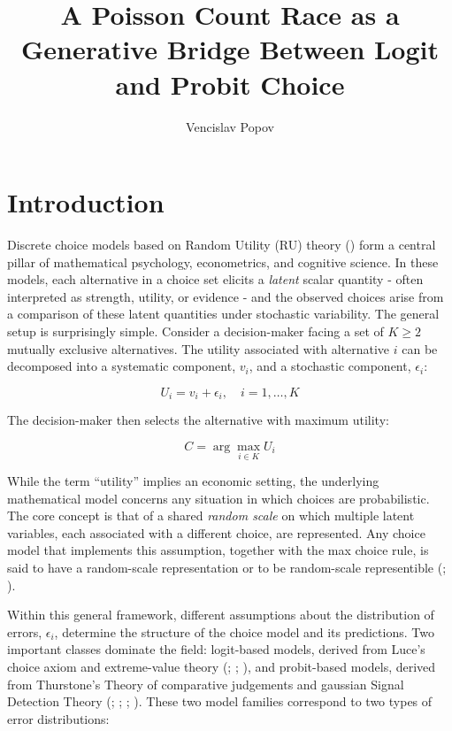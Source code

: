 \documentclass[
  man,
  floatsintext,
  longtable,
  a4paper,
  nolmodern,
  notxfonts,
  notimes,
  colorlinks=true,linkcolor=blue,citecolor=blue,urlcolor=blue]{apa7}
\title{A Poisson Count Race as a Generative Bridge Between Logit and
Probit Choice}
\author{Vencislav Popov}
\affiliation{
{Department of Psychology, University of Zurich}}
\begin{document}
\maketitle



\setcounter{secnumdepth}{3}

\setlength\LTleft{0pt}




\section{Introduction}\label{introduction}

Discrete choice models based on Random Utility (RU) theory
()
form a central pillar of mathematical psychology, econometrics, and
cognitive science. In these models, each alternative in a choice set
elicits a \emph{latent} scalar quantity - often interpreted as strength,
utility, or evidence - and the observed choices arise from a comparison
of these latent quantities under stochastic variability. The general
setup is surprisingly simple. Consider a decision-maker facing a set of
\(K \ge 2\) mutually exclusive alternatives. The utility associated with
alternative \(i\) can be decomposed into a systematic component,
\(v_i\), and a stochastic component, \(\epsilon_i\):

\[
U_{i} = v_{i} + \epsilon_{i}, \quad i=1, \dots, K
\]

The decision-maker then selects the alternative with maximum utility:

\[
C = \arg \max_{i \in K} U_{i}
\]

While the term ``utility'' implies an economic setting, the underlying
mathematical model concerns any situation in which choices are
probabilistic. The core concept is that of a shared \emph{random scale}
on which multiple latent variables, each associated with a different
choice, are represented. Any choice model that implements this
assumption, together with the max choice rule, is said to have a
random-scale representation or to be random-scale representible
(; ).

Within this general framework, different assumptions about the
distribution of errors, \(\epsilon_i\), determine the structure of the
choice model and its predictions. Two important classes dominate the
field: logit-based models, derived from Luce's choice axiom and
extreme-value theory
(;
;
), and
probit-based models, derived from Thurstone's Theory of comparative
judgements and gaussian Signal Detection Theory
(; ;
;
). These
two model families correspond to two types of error distributions:
\end{document}
